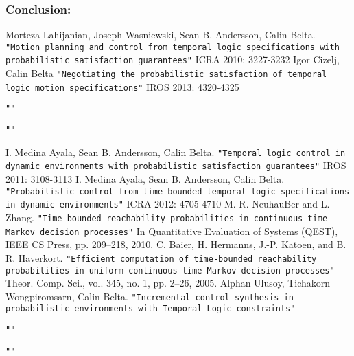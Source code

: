 \documentclass{article}
\theoremstyle{definition}
\begin{document}
\subsubsection{Conclusion:}




\begin{thebibliography}{}
Morteza Lahijanian, Joseph Wasniewski, Sean B. Andersson, Calin Belta.
\texttt{"Motion planning and control from temporal logic specifications with probabilistic satisfaction guarantees"}
ICRA 2010: 3227-3232
Igor Cizelj, Calin Belta
\texttt{"Negotiating the probabilistic satisfaction of temporal logic motion specifications"}
IROS 2013: 4320-4325

\texttt{""}


\texttt{""}


I. Medina Ayala, Sean B. Andersson, Calin Belta.
\texttt{"Temporal logic control in dynamic environments with probabilistic satisfaction guarantees"}
IROS 2011: 3108-3113
I. Medina Ayala, Sean B. Andersson, Calin Belta.
\texttt{"Probabilistic control from time-bounded temporal logic specifications in dynamic environments"}
ICRA 2012: 4705-4710
M. R. NeuhauBer and L. Zhang.
\texttt{"Time-bounded reachability probabilities
in continuous-time Markov decision processes"}
In Quantitative Evaluation of Systems (QEST), IEEE CS Press, pp. 209–218, 2010.
C. Baier, H. Hermanns, J.-P. Katoen, and B. R. Haverkort.
\texttt{"Efficient computation of time-bounded reachability probabilities in uniform continuous-time Markov decision processes"}
Theor. Comp. Sci., vol. 345, no. 1, pp. 2–26, 2005.
Alphan Ulusoy, Tichakorn Wongpiromsarn, Calin Belta.
\texttt{"Incremental control synthesis in probabilistic environments with Temporal Logic constraints"}

\texttt{""}

\texttt{""}


\end{thebibliography}
\end{document}
